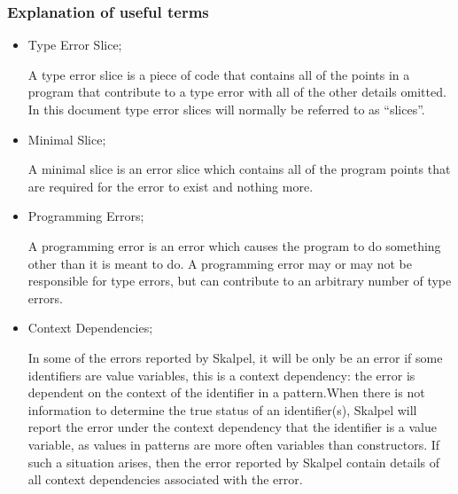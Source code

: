 \documentclass{article}
\begin{document}
\subsubsection{Explanation of useful terms}
\begin{itemize}


\item Type Error Slice;

  \subitem A type error slice is a piece of code that contains all of
  the points in a program that contribute to a type error with all of
  the other details omitted. In this document type error slices will
  normally be referred to as ``slices''.



\item Minimal Slice;

  \subitem A minimal slice is an error slice which contains all of the
  program points that are required for the error to exist and nothing
  more.



\item Programming Errors;

  \subitem A programming error is an error which causes the program to
  do something other than it is meant to do. A programming error may
  or may not be responsible for type errors, but can contribute to an
  arbitrary number of type errors.


\item Context Dependencies;

  \subitem In some of the errors reported by Skalpel, it
  will be only be an error if some identifiers are value variables,
  this is a context dependency: the error is dependent on the context
  of the identifier in a pattern.When there is not information to
  determine the true status of an identifier(s), Skalpel
  will report the error under the context dependency that the
  identifier is a value variable, as values in patterns are more often
  variables than constructors. If such a situation arises, then the
  error reported by Skalpel contain details of all
  context dependencies associated with the error.



\end{itemize}
\end{document}
